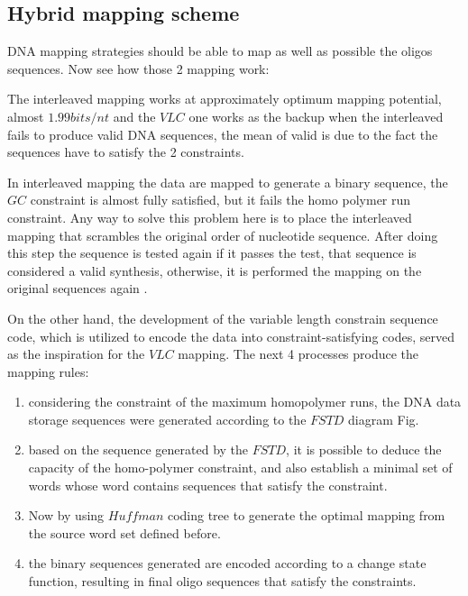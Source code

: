 \documentclass[10pt,twocolumn,twoside]{gsajnl}
\theoremstyle{definition}
\begin{document}
\subsection{Hybrid mapping scheme}
DNA mapping strategies should be able to map as well as possible the oligos sequences. Now see how those 2 mapping work:

The interleaved mapping works at approximately optimum mapping potential, almost $1.99 bits/nt$ and the $VLC$ one works as the backup when the interleaved fails to produce valid DNA sequences, the mean of valid is due to the fact the sequences have to satisfy the 2 constraints.

In interleaved mapping the data are mapped to generate a binary sequence, the $GC$ constraint is almost fully satisfied, but it fails the homo polymer run constraint. Any way to solve this problem here is to place the interleaved mapping that scrambles the original order of nucleotide sequence. After doing this step the sequence is tested again if it passes the test, that sequence is considered a valid synthesis, otherwise, it is performed the mapping on the original sequences again \cite{wang2019high}.

On the other hand, the development of the variable length constrain sequence code, which is utilized to encode the data into constraint-satisfying codes, served as the inspiration for the $VLC$ mapping. The next 4 processes produce the mapping rules:

\begin{enumerate}
    \item considering the constraint of the maximum homopolymer runs, the DNA data storage sequences were generated according to the $FSTD$ diagram Fig.
    \item based on the sequence generated by the $FSTD$, it is possible to deduce the capacity of the homo-polymer constraint, and also establish a minimal set of words whose word contains sequences that satisfy the constraint.
    \item Now by using $Huffman$ coding tree to generate the optimal mapping from the source word set defined before.
    \item the binary sequences generated are encoded according to a change state function, resulting in final oligo sequences that satisfy the constraints.
\end{enumerate}
\end{document}

